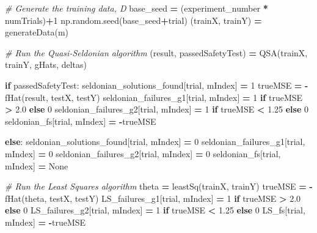 \documentclass[12pt, twoside]{amherstthesis}
\newenvironment{Shaded}{\begin{snugshade}}{\end{snugshade}}
\newcommand{\CommentTok}[1]{\textcolor[rgb]{0.56,0.35,0.01}{\textit{#1}}}
\newcommand{\ControlFlowTok}[1]{\textcolor[rgb]{0.13,0.29,0.53}{\textbf{#1}}}
\newcommand{\DecValTok}[1]{\textcolor[rgb]{0.00,0.00,0.81}{#1}}
\newcommand{\FloatTok}[1]{\textcolor[rgb]{0.00,0.00,0.81}{#1}}
\newcommand{\NormalTok}[1]{#1}
\newcommand{\OperatorTok}[1]{\textcolor[rgb]{0.81,0.36,0.00}{\textbf{#1}}}
\newcommand{\VariableTok}[1]{\textcolor[rgb]{0.00,0.00,0.00}{#1}}
\begin{document}
\begin{Shaded}
\begin{Highlighting}[]
            \CommentTok{\# Generate the training data, D}
\NormalTok{            base\_seed         }\OperatorTok{=}\NormalTok{ (experiment\_number }\OperatorTok{*}\NormalTok{ numTrials)}\OperatorTok{+}\DecValTok{1}
\NormalTok{            np.random.seed(base\_seed}\OperatorTok{+}\NormalTok{trial) }
\NormalTok{            (trainX, trainY)  }\OperatorTok{=}\NormalTok{ generateData(m)}
            
            \CommentTok{\# Run the Quasi{-}Seldonian algorithm}
\NormalTok{            (result, passedSafetyTest) }\OperatorTok{=}\NormalTok{ QSA(trainX, trainY, gHats, }
\NormalTok{            deltas)}
            
            \ControlFlowTok{if}\NormalTok{ passedSafetyTest:}
\NormalTok{                seldonian\_solutions\_found[trial, mIndex] }\OperatorTok{=} \DecValTok{1}                        
\NormalTok{                trueMSE }\OperatorTok{=} \OperatorTok{{-}}\NormalTok{fHat(result, testX, testY)                               }
\NormalTok{                seldonian\_failures\_g1[trial, mIndex] }\OperatorTok{=} \DecValTok{1} 
                \ControlFlowTok{if}\NormalTok{ trueMSE }\OperatorTok{\textgreater{}} \FloatTok{2.0}  \ControlFlowTok{else} \DecValTok{0}   
\NormalTok{                seldonian\_failures\_g2[trial, mIndex] }\OperatorTok{=} \DecValTok{1} 
                \ControlFlowTok{if}\NormalTok{ trueMSE }\OperatorTok{\textless{}} \FloatTok{1.25} \ControlFlowTok{else} \DecValTok{0}   
\NormalTok{                seldonian\_fs[trial, mIndex] }\OperatorTok{=} \OperatorTok{{-}}\NormalTok{trueMSE                              }
                
            \ControlFlowTok{else}\NormalTok{:}
\NormalTok{                seldonian\_solutions\_found[trial, mIndex] }\OperatorTok{=} \DecValTok{0}             
\NormalTok{                seldonian\_failures\_g1[trial, mIndex]     }\OperatorTok{=} \DecValTok{0}             
\NormalTok{                seldonian\_failures\_g2[trial, mIndex]     }\OperatorTok{=} \DecValTok{0}            
\NormalTok{                seldonian\_fs[trial, mIndex]              }\OperatorTok{=} \VariableTok{None}          

            \CommentTok{\# Run the Least Squares algorithm}
\NormalTok{            theta }\OperatorTok{=}\NormalTok{ leastSq(trainX, trainY)                              }
\NormalTok{            trueMSE }\OperatorTok{=} \OperatorTok{{-}}\NormalTok{fHat(theta, testX, testY)                         }
\NormalTok{            LS\_failures\_g1[trial, mIndex] }\OperatorTok{=} \DecValTok{1} \ControlFlowTok{if}\NormalTok{ trueMSE }\OperatorTok{\textgreater{}} \FloatTok{2.0}  \ControlFlowTok{else} \DecValTok{0}   
\NormalTok{            LS\_failures\_g2[trial, mIndex] }\OperatorTok{=} \DecValTok{1} \ControlFlowTok{if}\NormalTok{ trueMSE }\OperatorTok{\textless{}} \FloatTok{1.25} \ControlFlowTok{else} \DecValTok{0}   
\NormalTok{            LS\_fs[trial, mIndex] }\OperatorTok{=} \OperatorTok{{-}}\NormalTok{trueMSE                             }
        

\end{Highlighting}
\end{Shaded}
\end{document}
